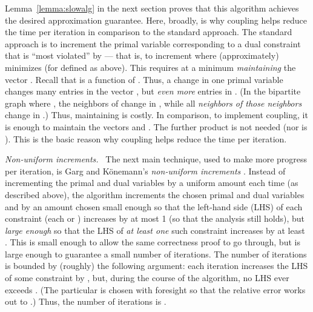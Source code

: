 \documentclass[11pt]{svjour3} \usepackage{fullpage}
\renewcommand{\paragraph}[1]{\smallskip\vspace{2pt}\par{\em #1}~}
\begin{document}
Lemma~\ref{lemma:slowalg} in the next section proves that this algorithm
achieves the desired approximation guarantee.
Here, broadly, is why coupling helps reduce the time per iteration
in comparison to the standard approach.
The standard approach is to increment the primal variable corresponding 
to a dual constraint that is ``most violated'' by  ---
that is, to increment  where  (approximately) minimizes 
(for  defined as above).
This requires at a minimum {\em maintaining} the vector .
Recall that  is a function of .
Thus, a change in one primal variable  
changes many entries in the vector ,
but {\em even more} entries in .
(In the  bipartite graph  where ,
the neighbors of  change in ,
while all {\em neighbors of those neighbors} change in .)
Thus, maintaining  is costly.
In comparison, to implement coupling, it is enough to maintain the vectors  and .
The further product  is not needed (nor is ).
This is the basic reason why coupling helps reduce the time per iteration.

\paragraph{Non-uniform increments.}
The next main technique, used to make more progress per iteration,
is Garg and K\"onemann's {\em non-uniform increments} \cite{Garg98Faster,Konemann98Fast,garg2007faster}.
Instead of incrementing the primal and dual variables by a uniform amount each time (as described above), the algorithm increments the chosen primal and dual variables  and  by an amount  chosen small enough so that the left-hand side (LHS) of 
each constraint (each  or ) increases by at most 1 (so that the analysis still holds), but {\em large enough} so that the LHS of {\em at least one} such constraint increases by at least .
This is small enough to allow the same correctness proof to go through, 
but is large enough to guarantee a small number of iterations.
The number of iterations is bounded by (roughly) the following argument:
each iteration increases the LHS of some constraint by ,
but, during the course of the algorithm, no LHS ever exceeds .
(The particular  is chosen with foresight so that the relative error works out to .)
Thus, the number of iterations is .
\end{document}

